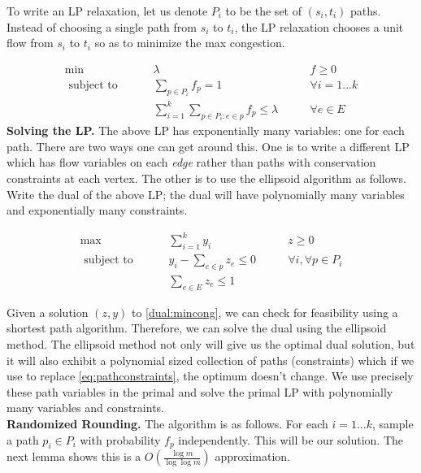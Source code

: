 \documentclass[11pt]{article}
\begin{document}
To write an LP relaxation, let us denote $P_i$ to be the set of $(s_i,t_i)$ paths. Instead of choosing a single path from $s_i$ to $t_i$, the LP relaxation chooses a unit flow from $s_i$ to $t_i$ so as to minimize the max congestion. 

\begin{align}
\min &\qquad \lambda &\qquad f \ge 0 \label{lp:mincong} \\ 
\textrm{ subject to } 	& \qquad \sum_{p\in P_i} f_p = 1 & \qquad \forall i=1...k \label{eq:cong} \\
				& \qquad \sum_{i=1}^k\sum_{p\in P_i: e\in p} f_p \le \lambda & \qquad \forall e\in E
\end{align}
\noindent
{\bf Solving the LP.}
The above LP has exponentially many variables: one for each path. There are two ways one can get around this. One is to write a different LP which has flow variables on each {\em edge} rather than paths with conservation constraints at each vertex. The other is to use the ellipsoid algorithm as follows. Write the dual of the above LP; the dual will have polynomially many variables and exponentially many constraints.

\begin{align}
\max &\qquad \sum_{i=1}^k y_i &\qquad z\ge 0 \label{dual:mincong} \\ 
\textrm{ subject to } 	& \qquad y_i - \sum_{e\in p}z_e	 \le 0 & \qquad \forall i, \forall p\in P_i \label{eq:pathconstraints}\\
				& \qquad  \sum_{e\in E} z_e \le 1 & 
\end{align}

Given a solution $(z,y)$ to \eqref{dual:mincong}, we can check for feasibility using a shortest path algorithm. 
Therefore, we can solve the dual using the ellipsoid method. The ellipsoid method not only will give us the optimal dual solution, but it will also exhibit a polynomial sized collection of paths (constraints) which if we use to replace \eqref{eq:pathconstraints}, the optimum doesn't change. We use precisely these path variables in the primal and solve the primal LP with polynomially many variables and constraints. \\

\noindent
{\bf Randomized Rounding.} The algorithm is as follows. For each $i=1...k$, sample a path $p_i\in P_i$ with 
probability $f_p$ independently. This will be our solution. The next lemma shows this is a $O(\frac{\log m}{\log 
\log m})$ approximation.
\end{document}
